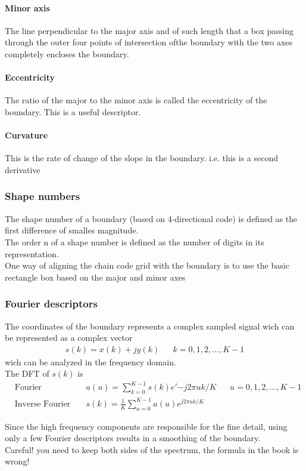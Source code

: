 \paragraph{Minor axis}
The line perpendicular to the major axis and of such length that a box passing through the outer four points of intersection ofthe boundary with the two axes completely encloses the boundary.
\paragraph{Eccentricity}
The ratio of the major to the minor axis is called the eccentricity of the boundary. This is a useful descriptor.
\paragraph{Curvature}
This is the rate of change of the slope in the boundary. i.e. this is a second derivative
\subsubsection{Shape numbers}
The shape number of a boundary (based on 4-directional code) is defined as the first difference of smalles magnitude.\\
The order n of a shape number is defined as the number of digits in its representation.\\
One way of aligning the chain code grid with the boundary is to use the basic rectangle box based on the major and minor axes\\
\subsubsection{Fourier descriptors}
The coordinates of the boundary represents a complex sampled signal wich can be represented as a complex vector 
\begin{align*}
s(k)=x(k)+jy(k) && k=0,1,2,\ldots,K-1
\end{align*} 
wich can be analyzed in the frequency domain.\\
The DFT of $s(k)$ is \begin{align*}
& \text{Fourier descriptors of the boundary:} && a(u)=\sum\limits_{k=0}^{K-1}s(k)e'{-j2\pi uk/K} && u=0,1,2,\ldots,K-1\\
& \text{Inverse Fourier transform:} && s(k)=\frac{1}{K}\sum\limits_{u=0}^{K-1}a(u)e^{j2\pi uk/K}
\end{align*} 

Since the high frequency components are responsible for the fine detail, using only a few Fourier descriptors results in a smoothing of the boundary.\\
Careful! you need to keep both sides of the spectrum, the formula in the book is wrong!\\

